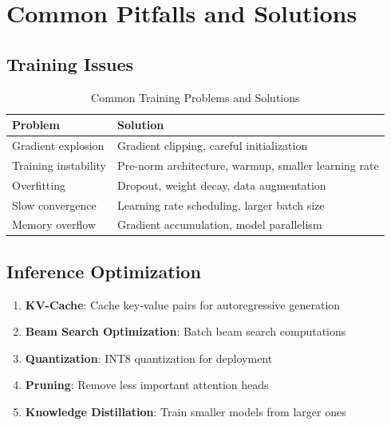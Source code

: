 \documentclass[11pt]{article}
\begin{document}
\section{Common Pitfalls and Solutions}

\subsection{Training Issues}

\begin{table}[H]
\centering
\caption{Common Training Problems and Solutions}
\begin{tabular}{l l}
\toprule
\textbf{Problem} & \textbf{Solution} \\
\midrule
Gradient explosion & Gradient clipping, careful initialization \\
Training instability & Pre-norm architecture, warmup, smaller learning rate \\
Overfitting & Dropout, weight decay, data augmentation \\
Slow convergence & Learning rate scheduling, larger batch size \\
Memory overflow & Gradient accumulation, model parallelism \\
\bottomrule
\end{tabular}
\end{table}

\subsection{Inference Optimization}

\begin{enumerate}
    \item \textbf{KV-Cache}: Cache key-value pairs for autoregressive generation
    \item \textbf{Beam Search Optimization}: Batch beam search computations
    \item \textbf{Quantization}: INT8 quantization for deployment
    \item \textbf{Pruning}: Remove less important attention heads
    \item \textbf{Knowledge Distillation}: Train smaller models from larger ones
\end{enumerate}

\end{document}
